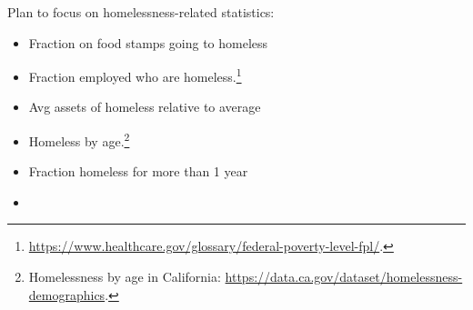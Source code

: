 \documentclass[parskip=full]{article}
\begin{document}
Plan to focus on homelessness-related statistics:
\begin{itemize}
    \item Fraction on food stamps going to homeless
    \item Fraction employed who are homeless.\footnote{    \url{https://www.healthcare.gov/glossary/federal-poverty-level-fpl/}.}
    \item Avg assets of homeless relative to average
    \item Homeless by age.\footnote{Homelessness by age in California: \url{https://data.ca.gov/dataset/homelessness-demographics}.}
    \item Fraction homeless for more than 1 year
    \item 
\end{itemize}

\end{document}
